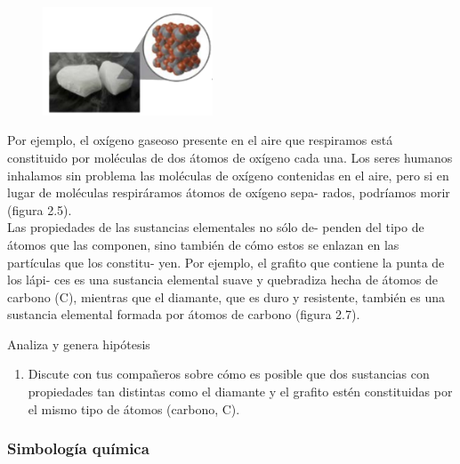 \documentclass[11pt]{book}
\begin{document}
\begin{figure}
  \centering
  \includegraphics[width=0.45\textwidth]{atomos06.png}
  \label{fig:atomos06}
\end{figure}

Por ejemplo, el oxígeno gaseoso presente en el aire que respiramos
está constituido por moléculas de dos átomos de oxígeno cada una. Los seres
humanos inhalamos sin problema las moléculas de oxígeno contenidas en
el aire, pero si en lugar de moléculas respiráramos átomos de oxígeno sepa-
rados, podríamos morir (figura 2.5).\\

Las propiedades de las sustancias elementales no sólo de-
penden del tipo de átomos que las componen, sino también
de cómo estos se enlazan en las partículas que los constitu-
yen. Por ejemplo, el grafito que contiene la punta de los lápi-
ces es una sustancia elemental suave y quebradiza hecha de
átomos de carbono (C), mientras que el diamante, que es duro
y resistente, también es una sustancia elemental formada por
átomos de carbono (figura 2.7).\\

\begin{boxK}
  Analiza y genera hipótesis
  \begin{enumerate}
    \item Discute con tus compañeros sobre cómo es posible que
          dos sustancias con propiedades tan distintas como el
          diamante y el grafito estén constituidas por el mismo
          tipo de átomos (carbono, C).
  \end{enumerate}
\end{boxK}

\subsubsection{Simbología química}
\end{document}
